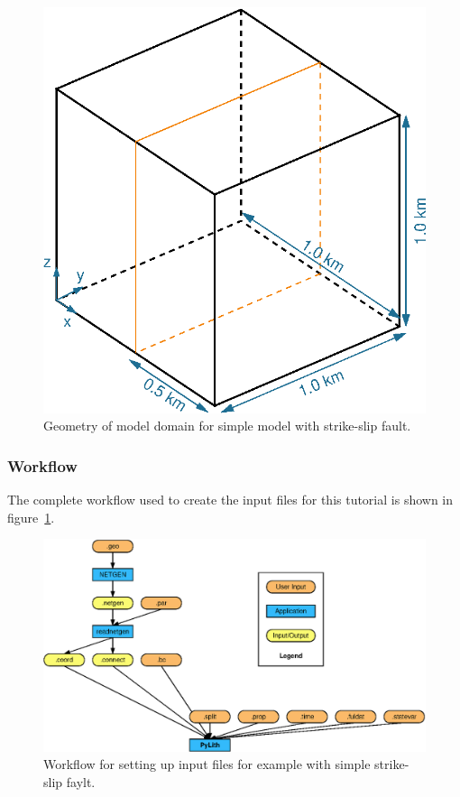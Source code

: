 \begin{figure}
  \begin{center}
    \includegraphics{figs/geometry}
    \caption{Geometry of model domain for simple model with
      strike-slip fault.}
  \end{center}
\end{figure}  

\subsubsection{Workflow}

The complete workflow used to create the input files for this tutorial
is shown in figure~\ref{fig:splitcube:workflow}. 

\begin{figure}[htbp]
  \begin{center}
    \includegraphics{figs/workflow}
    \caption{Workflow for setting up input files for example with
      simple strike-slip faylt.}
    \label{fig:splitcube:workflow}
  \end{center}
\end{figure}

